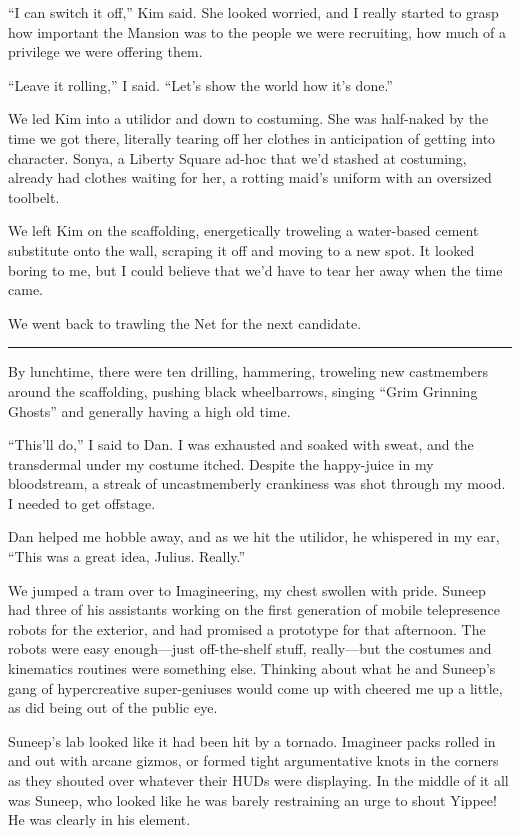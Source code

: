 “I can switch it off,” Kim said. She looked worried, and I really
started to grasp how important the Mansion was to the people we
were recruiting, how much of a privilege we were offering them.

“Leave it rolling,” I said. “Let's show the world how it's done.”

We led Kim into a utilidor and down to costuming. She was
half-naked by the time we got there, literally tearing off her
clothes in anticipation of getting into character. Sonya, a Liberty
Square ad-hoc that we'd stashed at costuming, already had clothes
waiting for her, a rotting maid's uniform with an oversized
toolbelt.

We left Kim on the scaffolding, energetically troweling a
water-based cement substitute onto the wall, scraping it off and
moving to a new spot. It looked boring to me, but I could believe
that we'd have to tear her away when the time came.

We went back to trawling the Net for the next candidate.

\begin{center}\rule{3in}{0.4pt}\end{center}

By lunchtime, there were ten drilling, hammering, troweling new
castmembers around the scaffolding, pushing black wheelbarrows,
singing “Grim Grinning Ghosts” and generally having a high old
time.

“This'll do,” I said to Dan. I was exhausted and soaked with sweat,
and the transdermal under my costume itched. Despite the
happy-juice in my bloodstream, a streak of uncastmemberly
crankiness was shot through my mood. I needed to get offstage.

Dan helped me hobble away, and as we hit the utilidor, he whispered
in my ear, “This was a great idea, Julius. Really.”

We jumped a tram over to Imagineering, my chest swollen with pride.
Suneep had three of his assistants working on the first generation
of mobile telepresence robots for the exterior, and had promised a
prototype for that afternoon. The robots were easy enough—just
off-the-shelf stuff, really—but the costumes and kinematics
routines were something else. Thinking about what he and Suneep's
gang of hypercreative super-geniuses would come up with cheered me
up a little, as did being out of the public eye.

Suneep's lab looked like it had been hit by a tornado. Imagineer
packs rolled in and out with arcane gizmos, or formed tight
argumentative knots in the corners as they shouted over whatever
their HUDs were displaying. In the middle of it all was Suneep, who
looked like he was barely restraining an urge to shout Yippee! He
was clearly in his element.

